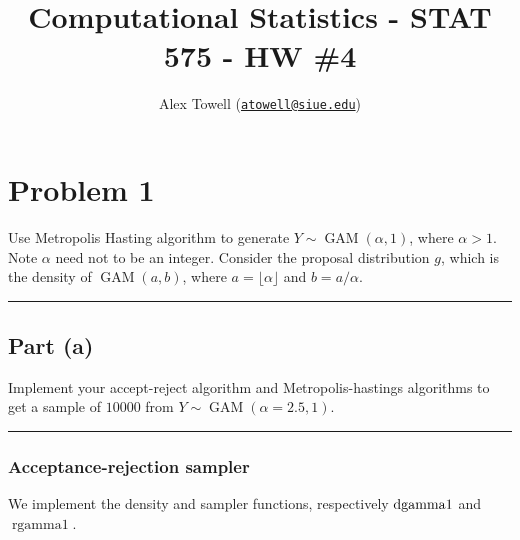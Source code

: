 \documentclass[
  11pt,
]{paper}
\title{Computational Statistics - STAT 575 - HW \#4}
\author{Alex Towell
(\href{mailto:atowell@siue.edu}{\nolinkurl{atowell@siue.edu}})}
\date{}
\begin{document}
\maketitle

\usepackage{amsmath}
\usepackage{mathtools}
\usepackage{amsthm}
\usepackage{bm}
\usepackage{xcolor}
\usepackage{fbox}
\usepackage{amsmath}

\newcommand{\var}{\operatorname{Var}}
\newcommand{\expect}{\operatorname{E}}
\newcommand{\cov}{\operatorname{Cov}}
\newcommand{\se}{\operatorname{SE}}
\newcommand{\mat}[1]{\mathbf{#1}} 
\newcommand{\eval}[2]{\left. #1 \right\vert_{#2}}
\newcommand{\poi}{\operatorname{POI}}
\newcommand{\argmax}{\operatorname{arg\,max}}

\hypertarget{problem-1}{%
\section{Problem 1}\label{problem-1}}

Use Metropolis Hasting algorithm to generate
\(Y \sim \operatorname{GAM}(\alpha, 1)\), where \(\alpha > 1\). Note
\(\alpha\) need not to be an integer. Consider the proposal distribution
\(g\), which is the density of \(\operatorname{GAM}(a,b)\), where
\(a=\lfloor \alpha \rfloor\) and \(b = a/\alpha\).

\begin{center}\rule{0.5\linewidth}{0.5pt}\end{center}

\hypertarget{part-a}{%
\subsection{Part (a)}\label{part-a}}

Implement your accept-reject algorithm and Metropolis-hastings
algorithms to get a sample of \(10000\) from
\(Y \sim \operatorname{GAM}(\alpha=2.5,1)\).

\begin{center}\rule{0.5\linewidth}{0.5pt}\end{center}

\hypertarget{acceptance-rejection-sampler}{%
\subsubsection{Acceptance-rejection
sampler}\label{acceptance-rejection-sampler}}

We implement the density and sampler functions, respectively
\(\rm{dgamma1}\) and \(\operatorname{rgamma1}\).
\end{document}
